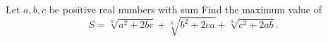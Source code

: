 Let $a,b,c$ be positive real numbers with sum  Find the maximum value of
\[S = \sqrt[3]{{{a^2} + 2bc}} + \sqrt[3]{{{b^2} + 2ca}} + \sqrt[3]{{{c^2} + 2ab}}.\]